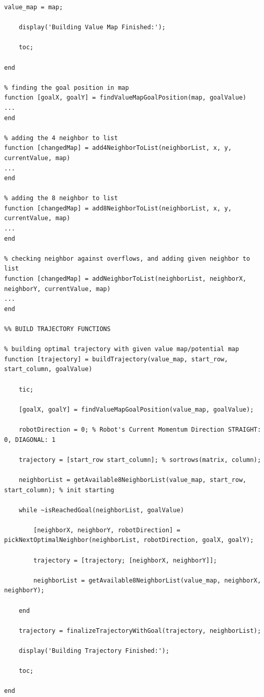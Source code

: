\documentclass{article}
\begin{document}
\begin{lstlisting}[label=wavefront-m, caption=wavefront.m]
    value_map = map;
    
    display('Building Value Map Finished:');
    
    toc;
    
end

% finding the goal position in map
function [goalX, goalY] = findValueMapGoalPosition(map, goalValue)
...
end

% adding the 4 neighbor to list
function [changedMap] = add4NeighborToList(neighborList, x, y, currentValue, map)
...
end

% adding the 8 neighbor to list
function [changedMap] = add8NeighborToList(neighborList, x, y, currentValue, map)
...
end

% checking neighbor against overflows, and adding given neighbor to list
function [changedMap] = addNeighborToList(neighborList, neighborX, neighborY, currentValue, map)
...
end

%% BUILD TRAJECTORY FUNCTIONS

% building optimal trajectory with given value map/potential map
function [trajectory] = buildTrajectory(value_map, start_row, start_column, goalValue)

    tic;
    
    [goalX, goalY] = findValueMapGoalPosition(value_map, goalValue);
    
    robotDirection = 0; % Robot's Current Momentum Direction STRAIGHT: 0, DIAGONAL: 1
    
    trajectory = [start_row start_column]; % sortrows(matrix, column);
    
    neighborList = getAvailable8NeighborList(value_map, start_row, start_column); % init starting
    
    while ~isReachedGoal(neighborList, goalValue)
        
        [neighborX, neighborY, robotDirection] = pickNextOptimalNeighbor(neighborList, robotDirection, goalX, goalY);
        
        trajectory = [trajectory; [neighborX, neighborY]];
        
        neighborList = getAvailable8NeighborList(value_map, neighborX, neighborY);
        
    end
    
    trajectory = finalizeTrajectoryWithGoal(trajectory, neighborList);
    
    display('Building Trajectory Finished:');
    
    toc;
    
end


\end{lstlisting}
\end{document}
